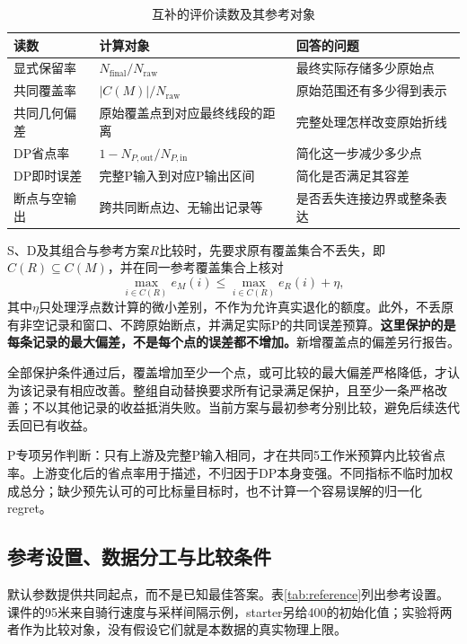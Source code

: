 \begin{table}[htbp]\centering\small
\caption{互补的评价读数及其参考对象}\label{tab:metrics}
\begin{tabularx}{\linewidth}{@{}L{28mm}L{55mm}Y@{}}\toprule
读数 & 计算对象 & 回答的问题\\\midrule
显式保留率 & $N_{\mathrm{final}}/N_{\mathrm{raw}}$ & 最终实际存储多少原始点\\
共同覆盖率 & $|C(M)|/N_{\mathrm{raw}}$ & 原始范围还有多少得到表示\\
共同几何偏差 & 原始覆盖点到对应最终线段的距离 & 完整处理怎样改变原始折线\\
DP省点率 & $1-N_{P,\mathrm{out}}/N_{P,\mathrm{in}}$ & 简化这一步减少多少点\\
DP即时误差 & 完整P输入到对应P输出区间 & 简化是否满足其容差\\
断点与空输出 & 跨共同断点边、无输出记录等 & 是否丢失连接边界或整条表达\\\bottomrule
\end{tabularx}
\end{table}

S、D及其组合与参考方案$R$比较时，先要求原有覆盖集合不丢失，即$C(R)\subseteq C(M)$，并在同一参考覆盖集合上核对
\[
\max_{i\in C(R)}e_M(i)\leq\max_{i\in C(R)}e_R(i)+\eta,
\]
其中$\eta$只处理浮点数计算的微小差别，不作为允许真实退化的额度。此外，不丢原有非空记录和窗口、不跨原始断点，并满足实际P的共同误差预算。\textbf{这里保护的是每条记录的最大偏差，不是每个点的误差都不增加。}新增覆盖点的偏差另行报告。

全部保护条件通过后，覆盖增加至少一个点，或可比较的最大偏差严格降低，才认为该记录有相应改善。整组自动替换要求所有记录满足保护，且至少一条严格改善；不以其他记录的收益抵消失败。当前方案与最初参考分别比较，避免后续迭代丢回已有收益。

P专项另作判断：只有上游及完整P输入相同，才在共同5工作米预算内比较省点率。上游变化后的省点率用于描述，不归因于DP本身变强。不同指标不临时加权成总分；缺少预先认可的可比标量目标时，也不计算一个容易误解的归一化regret。

\subsection{参考设置、数据分工与比较条件}
默认参数提供共同起点，而不是已知最佳答案。表\ref{tab:reference}列出参考设置。课件的95米来自骑行速度与采样间隔示例，starter另给400的初始化值；实验将两者作为比较对象，没有假设它们就是本数据的真实物理上限。

